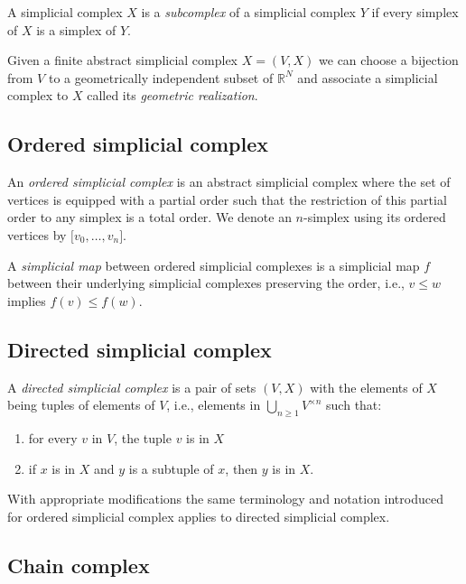 \documentclass{amsart}
\begin{document}
	A simplicial complex $X$ is a \textit{subcomplex} of a simplicial complex $Y$ if every simplex of $X$ is a simplex of $Y$.
	
	Given a finite abstract simplicial complex $X = (V, X)$ we can choose a bijection from $V$ to a geometrically independent subset of $\mathbb R^N$ and associate a
	simplicial complex
	to $X$ called its \textit{geometric realization}.
	
	\subsection*{Ordered simplicial complex}
	\label{ordered_simplical_complex}
	
	An \textit{ordered simplicial complex} is an 
	abstract simplicial complex where the set of vertices is equipped with a partial order such that the restriction of this partial order to any simplex is a total order. We denote an $n$-simplex using its ordered vertices by $\lbrack v_0, \dots, v_n \rbrack$.
	
	A \textit{simplicial map} between ordered simplicial complexes is a simplicial map $f$ between their underlying simplicial complexes preserving the order, i.e., $v \leq w$ implies $f(v) \leq f(w)$.
	
	\subsection*{Directed simplicial complex} \label{directed_simplicial_complex}
	
	A \textit{directed simplicial complex} is a pair of sets $(V, X)$ with the elements of $X$ being tuples of elements of $V$, i.e., elements in $\bigcup_{n\geq1} V^{\times n}$ such that: 
	\begin{enumerate}
		\item for every $v$ in $V$, the tuple $v$ is in $X$
		\item if $x$ is in $X$ and $y$ is a subtuple of $x$, then $y$ is in $X$. 
	\end{enumerate}
	
	With appropriate modifications the same terminology and notation introduced for
	ordered simplicial complex applies to directed simplicial complex.
	
	\subsection*{Chain complex} \label{chain_complex}
	
\end{document}

